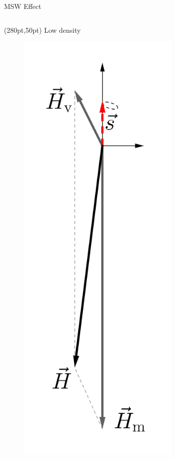 \documentclass[9pt]{beamer}
\begin{document}
\begin{darkframes}
\begin{frame}{MSW Effect}
{\begin{columns}[T]
\begin{column}{0.33\textwidth}
\begin{textblock*}{70pt}(280pt,50pt)
\small
Low density
\end{textblock*}



\begin{figure}
    \centering
    \colorbox{white}{\includegraphics[width=0.7\textwidth]{assets/matter-effect-large-density}}
\end{figure}



\end{column}
\end{columns}}
\end{frame}
\end{darkframes}
\end{document}
